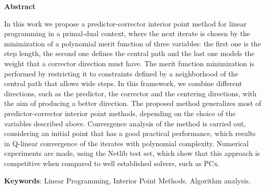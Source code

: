 \begin{center}
  \large{\textbf{Abstract}}
\end{center}




In this work we propose a predictor-corrector interior point method for linear programming in a primal-dual context, where the next iterate is chosen by the minimization of a polynomial merit function  of three variables: the first one is the step length, the second one defines the central path and the last one models the weight that a corrector direction must have. The merit function minimization is performed by restricting it to constraints defined by a neighborhood of the central path that allows wide steps. In this framework, we combine  different directions, such as the predictor, the corrector and the centering directions, with the aim of producing a better direction. The proposed method generalizes most of predictor-corrector interior point methods, depending on the choice of the variables described above. Convergence analysis of the method is carried out,  considering an initial point that has a good practical performance, which results in Q-linear convergence of the iterates with polynomial complexity. Numerical experiments are made, using the Netlib test set, which show that this approach is competitive when compared to  well established solvers, such as PCx.






\vspace{.5cm}
\textbf{Keywords}:
Linear Programming, Interior Point Methods,  Algorithm analysis.
